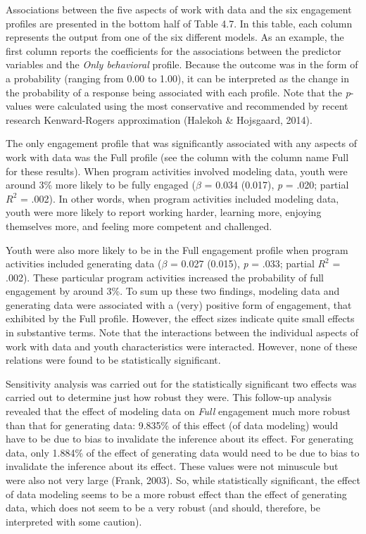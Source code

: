 \documentclass[]{msu-thesis}
\theoremstyle{definition}
\theoremstyle{definition}
\theoremstyle{definition}
\theoremstyle{remark}
\begin{document}
Associations between the five aspects of work with data and the six
engagement profiles are presented in the bottom half of Table 4.7. In
this table, each column represents the output from one of the six
different models. As an example, the first column reports the
coefficients for the associations between the predictor variables and
the \emph{Only behavioral} profile. Because the outcome was in the form
of a probability (ranging from 0.00 to 1.00), it can be interpreted as
the change in the probability of a response being associated with each
profile. Note that the \emph{p}-values were calculated using the most
conservative and recommended by recent research Kenward-Rogers
approximation (Halekoh \& Hojsgaard, 2014).

The only engagement profile that was significantly associated with any
aspects of work with data was the Full profile (see the column with the
column name Full for these results). When program activities involved
modeling data, youth were around 3\% more likely to be fully engaged
(\(\beta\) = 0.034 (0.017), \emph{p} = .020; partial \(R^2\) = .002). In
other words, when program activities included modeling data, youth were
more likely to report working harder, learning more, enjoying themselves
more, and feeling more competent and challenged.

Youth were also more likely to be in the Full engagement profile when
program activities included generating data (\(\beta\) = 0.027 (0.015),
\emph{p} = .033; partial \(R^2\) = .002). These particular program
activities increased the probability of full engagement by around 3\%.
To sum up these two findings, modeling data and generating data were
associated with a (very) positive form of engagement, that exhibited by
the Full profile. However, the effect sizes indicate quite small effects
in substantive terms. Note that the interactions between the individual
aspects of work with data and youth characteristics were interacted.
However, none of these relations were found to be statistically
significant.

Sensitivity analysis was carried out for the statistically significant
two effects was carried out to determine just how robust they were. This
follow-up analysis revealed that the effect of modeling data on
\emph{Full} engagement much more robust than that for generating data:
9.835\% of this effect (of data modeling) would have to be due to bias
to invalidate the inference about its effect. For generating data, only
1.884\% of the effect of generating data would need to be due to bias to
invalidate the inference about its effect. These values were not
minuscule but were also not very large (Frank, 2003). So, while
statistically significant, the effect of data modeling seems to be a
more robust effect than the effect of generating data, which does not
seem to be a very robust (and should, therefore, be interpreted with
some caution).
\end{document}
